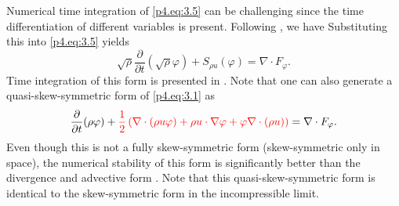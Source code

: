 Numerical time integration of \eqref{p4.eq:3.5} can be challenging since the time differentiation of different variables is present. Following \cite{morinishi2010skew}, we have
 Substituting this into \eqref{p4.eq:3.5} yields
\begin{equation} \label{p4.eq:3.6}
	\sqrt{\rho } \frac{\partial }{\partial t} (\sqrt \rho \varphi ) + S_{\rho u}(\varphi) = \nabla \cdot F_{\varphi}.
\end{equation}
Time integration of this form is presented in \cite{morinishi2010skew,reiss2014conservative}. Note that one can also generate a quasi-skew-symmetric form \cite{blaisdell1991numerical,morinishi2003dns} of \eqref{p4.eq:3.1} as
\begin{equation} \label{p4.eq:3.7}
	\frac{\partial }{\partial t} (\rho \varphi) + {\color{red}  \frac 1 2 \left( \nabla \cdot(\rho u \varphi) + \rho u \cdot \nabla \varphi + \varphi \nabla \cdot(\rho u) \right) } = \nabla \cdot F_{\varphi}.
\end{equation}
Even though this is not a fully skew-symmetric form (skew-symmetric only in space), the numerical stability of this form is significantly better than the divergence and advective form \cite{morinishi2010skew,blaisdell1991numerical,morinishi2003dns}. Note that this quasi-skew-symmetric form is identical to the skew-symmetric form in the incompressible limit.

